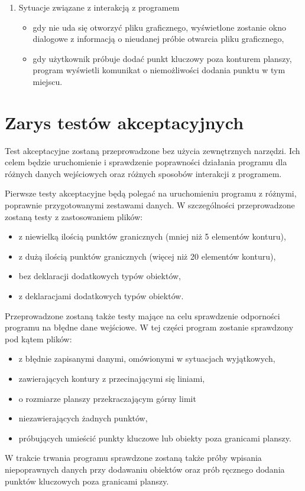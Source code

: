 \documentclass[a4paper,12pt]{article}
\newcommand\tab[1][0.6cm]{\hspace*{#1} }
\begin{document}
\begin{enumerate}
\begin{itemize}
\end{itemize}

\item Sytuacje związane z interakcją z programem
\begin{itemize}
\item gdy nie uda się otworzyć pliku graficznego, wyświetlone zostanie okno dialogowe z informacją o nieudanej próbie otwarcia pliku graficznego,
\item gdy użytkownik próbuje dodać punkt kluczowy poza konturem planszy, program wyświetli komunikat o niemożliwości dodania punktu w tym miejscu.
\end{itemize}
\end{enumerate}

\section{Zarys testów akceptacyjnych}

\tab Test akceptacyjne zostaną przeprowadzone bez użycia zewnętrznych narzędzi. Ich celem będzie uruchomienie i sprawdzenie poprawności działania programu dla różnych danych wejściowych oraz różnych sposobów interakcji z programem.

Pierwsze testy akceptacyjne będą polegać na uruchomieniu programu z różnymi, poprawnie przygotowanymi zestawami danych. W szczególności przeprowadzone zostaną testy z zastosowaniem plików:

\begin{itemize}
\item z niewielką ilością punktów granicznych (mniej niż 5 elementów konturu),
\item z dużą ilością punktów granicznych (więcej niż 20 elementów konturu),
\item bez deklaracji dodatkowych typów obiektów,
\item z deklaracjami dodatkowych typów obiektów.
\end{itemize}

Przeprowadzone zostaną także testy mające na celu sprawdzenie odporności programu na błędne dane wejściowe. W tej części program zostanie sprawdzony pod kątem plików:

\begin{itemize}
\item z błędnie zapisanymi danymi, omówionymi w sytuacjach wyjątkowych,
\item zawierających kontury z przecinającymi się liniami,
\item o rozmiarze planszy przekraczającym górny limit
\item niezawierających żadnych punktów,
\item próbujących umieścić punkty kluczowe lub obiekty poza granicami planszy.
\end{itemize}

W trakcie trwania programu sprawdzone zostaną także próby wpisania niepoprawnych danych przy dodawaniu obiektów oraz prób ręcznego dodania punktów kluczowych poza granicami planszy.
\end{document}
